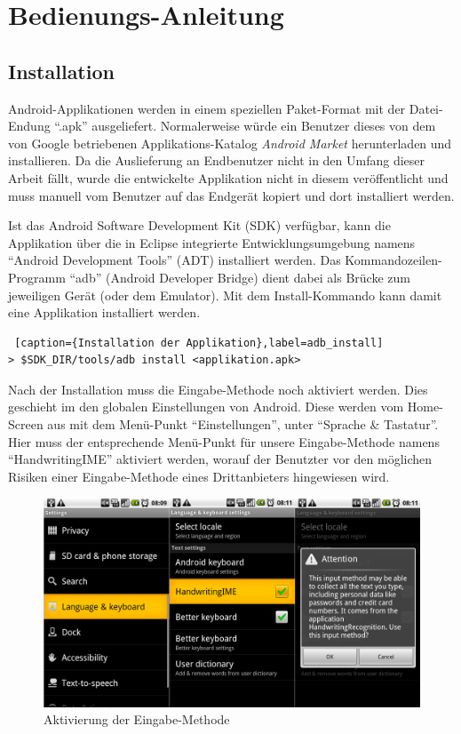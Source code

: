 \chapter{Bedienungs-Anleitung}

\section{Installation}

Android-Applikationen werden in einem speziellen Paket-Format mit der Datei-Endung ``.apk'' ausgeliefert. Normalerweise würde ein Benutzer dieses von dem von Google betriebenen Applikations-Katalog \emph{Android Market} herunterladen und installieren. Da die Auslieferung an Endbenutzer nicht in den Umfang dieser Arbeit fällt, wurde die entwickelte Applikation nicht in diesem veröffentlicht und muss manuell vom Benutzer auf das Endgerät kopiert und dort installiert werden.

Ist das Android Software Development Kit (SDK) verfügbar, kann die Applikation über die in Eclipse integrierte Entwicklungsumgebung namens ``Android Development Tools'' (ADT) installiert werden. Das Kommandozeilen-Programm ``adb'' (Android Developer Bridge) dient dabei als Brücke zum jeweiligen Gerät (oder dem Emulator). Mit dem Install-Kommando kann damit eine Applikation installiert werden.

\begin{lstlisting} [caption={Installation der Applikation},label=adb_install]
> $SDK_DIR/tools/adb install <applikation.apk>
\end{lstlisting}

Nach der Installation muss die Eingabe-Methode noch aktiviert werden. Dies geschieht im den globalen Einstellungen von Android. Diese werden vom Home-Screen aus mit dem Menü-Punkt ``Einstellungen'', unter ``Sprache  \& Tastatur''. Hier muss der entsprechende Menü-Punkt für unsere Eingabe-Methode namens ``HandwritingIME'' aktiviert werden, worauf der Benutzter vor den möglichen Risiken einer Eingabe-Methode eines Drittanbieters hingewiesen wird.

\begin{figure}[h!]
   \centering
   \includegraphics[scale=0.15]{img/manual_activate} 
   \caption{Aktivierung der Eingabe-Methode}
   \label{fig:manual_activate}
\end{figure}

